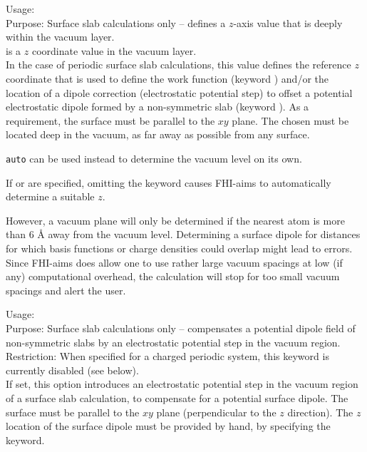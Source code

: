 {
  \noindent
  Usage:   \\[1.0ex]
  Purpose: Surface slab calculations only -- defines a $z$-axis value that is
  deeply within the vacuum layer.  \\[1.0ex]  is a
  $z$ coordinate value in the vacuum layer.  \\ 
}
%
In the case of periodic surface slab calculations, this value defines the
reference $z$ coordinate that is used to define the work function (keyword
) and/or the location of a dipole correction
(electrostatic potential step) to offset a potential electrostatic dipole
formed by a non-symmetric slab (keyword ).  
As a requirement, the surface must be parallel to the $xy$ plane. The chosen
 must be located deep in the vacuum, as far away as
possible from any surface. 

 \texttt{auto} can be used instead to
determine the vacuum level on its own. 

If  or
 are specified, omitting the keyword
 causes FHI-aims to automatically
determine a suitable $z$. 

However, a vacuum plane will only be determined if the nearest
atom is more than 6 {\AA} away from the vacuum level. Determining a
surface dipole for distances for which basis functions or charge
densities could overlap might lead to errors. Since
FHI-aims does allow one to use rather large vacuum spacings at low (if any)
computational overhead, the calculation will stop for too small vacuum
spacings and alert the user. 



{
  \noindent
  Usage:   \\[1.0ex]
  Purpose: Surface slab calculations only -- compensates a potential dipole
  field of non-symmetric slabs by an electrostatic potential step in the
  vacuum region.
  \\[1.0ex]
  Restriction: When specified for a charged periodic system,
    this keyword is currently disabled (see below). \\
}
If set, this option introduces an electrostatic potential step in the vacuum
region of a surface slab calculation, to compensate for a potential surface
dipole. The surface must be parallel to the $xy$ plane (perpendicular to the
$z$ direction). The $z$ location of the surface dipole must be provided by
hand, by specifying the  keyword.

